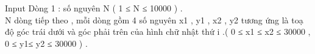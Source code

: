 Input
Dòng 1 : số nguyên N ( 1 ≤ N ≤ 10000 ) .   
\\   N dòng tiếp theo , mỗi dòng gồm 4 số nguyên x1 , y1 , x2 , y2 tương ứng là toạ độ góc trái dưới và góc phải trên của hình chữ nhật thứ i .( 0 ≤ x1 ≤ x2 ≤ 30000 , 0 ≤ y1≤ y2 ≤ 30000 ) .